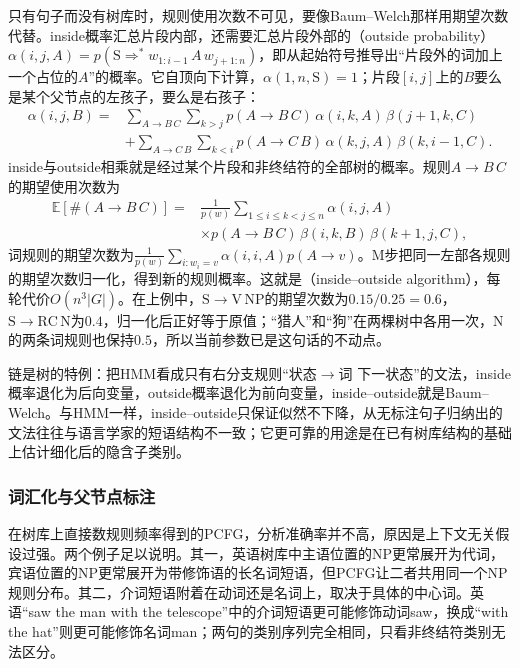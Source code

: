 只有句子而没有树库时，规则使用次数不可见，要像Baum--Welch那样用期望次数代替。inside概率汇总片段内部，还需要汇总片段外部的（outside probability）$\alpha(i,j,A)=p(\mathrm S\Rightarrow^{*}w_{1:i-1}\,A\,w_{j+1:n})$，即从起始符号推导出“片段外的词加上一个占位的$A$”的概率。它自顶向下计算，$\alpha(1,n,\mathrm S)=1$；片段$[i,j]$上的$B$要么是某个父节点的左孩子，要么是右孩子：
\begin{equation}
  \begin{aligned}
    \alpha(i,j,B)={}&\sum_{A\to B\,C}\sum_{k>j}p(A\to B\,C)\,\alpha(i,k,A)\,\beta(j+1,k,C)\\
    &+\sum_{A\to C\,B}\sum_{k<i}p(A\to C\,B)\,\alpha(k,j,A)\,\beta(k,i-1,C).
  \end{aligned}
  \label{eq:nlp-classical-outside}
\end{equation}
inside与outside相乘就是经过某个片段和非终结符的全部树的概率。规则$A\to B\,C$的期望使用次数为
\begin{equation}
  \begin{aligned}
    \mathbb E[\#(A\to B\,C)]={}&\frac{1}{p(w)}\sum_{1\leq i\leq k<j\leq n}\alpha(i,j,A)\\
    &\times p(A\to B\,C)\,\beta(i,k,B)\,\beta(k+1,j,C),
  \end{aligned}
  \label{eq:nlp-classical-rule-count}
\end{equation}
词规则的期望次数为$\frac{1}{p(w)}\sum_{i:w_i=v}\alpha(i,i,A)p(A\to v)$。M步把同一左部各规则的期望次数归一化，得到新的规则概率。这就是（inside--outside algorithm），每轮代价$O(n^3|G|)$。在上例中，$\mathrm S\to\mathrm V\,\mathrm{NP}$的期望次数为$0.15/0.25=0.6$，$\mathrm S\to\mathrm{RC}\,\mathrm N$为$0.4$，归一化后正好等于原值；“猎人”和“狗”在两棵树中各用一次，N的两条词规则也保持$0.5$，所以当前参数已是这句话的不动点。

链是树的特例：把HMM看成只有右分支规则“状态$\to$词 下一状态”的文法，inside概率退化为后向变量，outside概率退化为前向变量，inside--outside就是Baum--Welch。与HMM一样，inside--outside只保证似然不下降，从无标注句子归纳出的文法往往与语言学家的短语结构不一致；它更可靠的用途是在已有树库结构的基础上估计细化后的隐含子类别。

\subsubsection{词汇化与父节点标注}
\label{sec:nlp-classical-annotation}

在树库上直接数规则频率得到的PCFG，分析准确率并不高，原因是上下文无关假设过强。两个例子足以说明。其一，英语树库中主语位置的NP更常展开为代词，宾语位置的NP更常展开为带修饰语的长名词短语，但PCFG让二者共用同一个NP规则分布。其二，介词短语附着在动词还是名词上，取决于具体的中心词。英语“saw the man with the telescope”中的介词短语更可能修饰动词saw，换成“with the hat”则更可能修饰名词man；两句的类别序列完全相同，只看非终结符类别无法区分。

